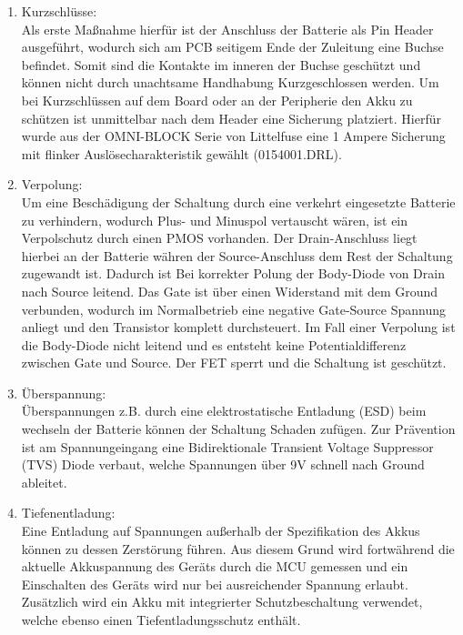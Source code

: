 \begin{enumerate}
	\item Kurzschlüsse: \\
	Als erste Maßnahme hierfür ist der Anschluss der Batterie als Pin Header ausgeführt, wodurch sich am PCB seitigem Ende der Zuleitung eine Buchse befindet. Somit sind die Kontakte im inneren der Buchse geschützt und können nicht durch unachtsame Handhabung Kurzgeschlossen werden. Um bei Kurzschlüssen auf dem Board oder an der Peripherie den Akku zu schützen ist unmittelbar nach dem Header eine Sicherung platziert. Hierfür wurde aus der OMNI-BLOCK Serie von Littelfuse eine 1 Ampere Sicherung mit flinker Auslösecharakteristik gewählt (0154001.DRL). 
	
	\item Verpolung: \\
Um eine Beschädigung der Schaltung durch eine verkehrt eingesetzte Batterie zu verhindern, wodurch Plus- und Minuspol vertauscht wären, ist ein Verpolschutz durch einen PMOS vorhanden. Der Drain-Anschluss liegt hierbei an der Batterie währen der Source-Anschluss dem Rest der Schaltung zugewandt ist. Dadurch ist Bei korrekter Polung der Body-Diode von Drain nach Source leitend. Das Gate ist über einen Widerstand mit dem Ground verbunden, wodurch im Normalbetrieb eine negative Gate-Source Spannung anliegt und den Transistor komplett durchsteuert. Im Fall einer Verpolung ist die Body-Diode nicht leitend und es entsteht keine Potentialdifferenz zwischen Gate und Source. Der FET sperrt und die Schaltung ist geschützt.

	\item Überspannung:\\
	Überspannungen z.B. durch eine elektrostatische Entladung (ESD) beim wechseln der Batterie können der Schaltung Schaden zufügen. Zur Prävention ist am Spannungeingang eine Bidirektionale Transient Voltage Suppressor (TVS) Diode verbaut, welche Spannungen über 9V schnell nach Ground ableitet.
	
	\item Tiefenentladung:\\
	Eine Entladung auf Spannungen außerhalb der Spezifikation des Akkus können zu dessen Zerstörung führen. Aus diesem Grund wird fortwährend die aktuelle Akkuspannung des Geräts durch die MCU gemessen und ein Einschalten des Geräts wird nur bei ausreichender Spannung erlaubt. Zusätzlich wird ein Akku mit integrierter Schutzbeschaltung verwendet, welche ebenso einen Tiefentladungsschutz enthält.

\end{enumerate}

